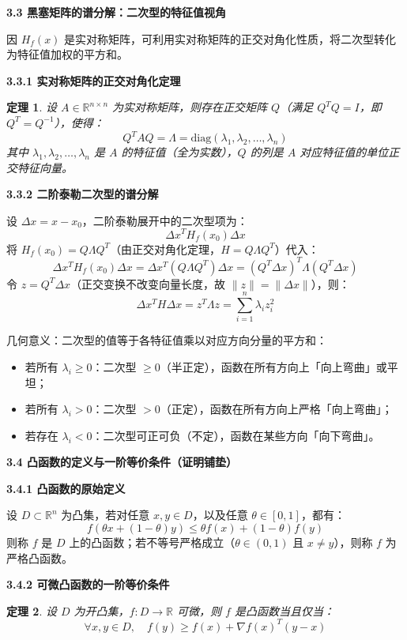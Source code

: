 \documentclass[10pt]{article}
\numberwithin{equation}{section}
\theoremstyle{plain}
\newtheorem{theorem}{定理}[section]
\theoremstyle{definition}
\theoremstyle{remark}
\newcommand{\R}{\mathbb{R}}
\newcommand{\norm}[1]{\lVert #1 \rVert}
\begin{document}
\textbf{3.3 黑塞矩阵的谱分解：二次型的特征值视角}

因 $H_f(x)$ 是实对称矩阵，可利用实对称矩阵的正交对角化性质，将二次型转化为特征值加权的平方和。

\textbf{3.3.1 实对称矩阵的正交对角化定理}

\begin{theorem}
	设 $A\in\R^{n\times n}$ 为实对称矩阵，则存在正交矩阵 $Q$（满足 $Q^TQ=I$，即 $Q^T=Q^{-1}$），使得：
	\[Q^TAQ=\Lambda=\text{diag}(\lambda_1,\lambda_2,\ldots,\lambda_n)\]
	其中 $\lambda_1,\lambda_2,\ldots,\lambda_n$ 是 $A$ 的特征值（全为实数），$Q$ 的列是 $A$ 对应特征值的单位正交特征向量。
\end{theorem}

\textbf{3.3.2 二阶泰勒二次型的谱分解}

设 $\Delta x=x-x_0$，二阶泰勒展开中的二次型项为：
\[\Delta x^TH_f(x_0)\Delta x\]
将 $H_f(x_0)=Q\Lambda Q^T$（由正交对角化定理，$H=Q\Lambda Q^T$）代入：
\[\Delta x^TH_f(x_0)\Delta x=\Delta x^T(Q\Lambda Q^T)\Delta x=(Q^T\Delta x)^T\Lambda(Q^T\Delta x)\]
令 $z=Q^T\Delta x$（正交变换不改变向量长度，故 $\norm{z}=\norm{\Delta x}$），则：
\[\Delta x^TH\Delta x=z^T\Lambda z=\sum_{i=1}^n\lambda_i z_i^2\]

几何意义：二次型的值等于各特征值乘以对应方向分量的平方和：
\begin{itemize}
	\item 若所有 $\lambda_i\geq 0$：二次型 $\geq 0$（半正定），函数在所有方向上「向上弯曲」或平坦；
	\item 若所有 $\lambda_i>0$：二次型 $> 0$（正定），函数在所有方向上严格「向上弯曲」；
	\item 若存在 $\lambda_i<0$：二次型可正可负（不定），函数在某些方向「向下弯曲」。
\end{itemize}

\textbf{3.4 凸函数的定义与一阶等价条件（证明铺垫）}

\textbf{3.4.1 凸函数的原始定义}

设 $D\subset\R^n$ 为凸集，若对任意 $x,y\in D$，以及任意 $\theta\in[0,1]$，都有：
\[f(\theta x+(1-\theta)y)\leq\theta f(x)+(1-\theta)f(y)\]
则称 $f$ 是 $D$ 上的凸函数；若不等号严格成立（$\theta\in(0,1)$ 且 $x\neq y$），则称 $f$ 为严格凸函数。

\textbf{3.4.2 可微凸函数的一阶等价条件}

\begin{theorem}
	设 $D$ 为开凸集，$f:D\to\R$ 可微，则 $f$ 是凸函数当且仅当：
	\[\forall x,y\in D,\quad f(y)\geq f(x)+\nabla f(x)^T(y-x)\]
\end{theorem}
\end{document}
